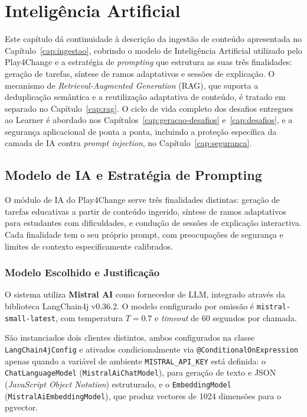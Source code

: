 %
%
\chapter{Inteligência Artificial} \label{cap:ia}

Este capítulo dá continuidade à descrição da ingestão de conteúdo apresentada no Capítulo~\ref{cap:ingestao}, cobrindo o modelo de Inteligência Artificial utilizado pelo Play4Change e a estratégia de \textit{prompting} que estrutura as suas três finalidades: geração de tarefas, síntese de ramos adaptativos e sessões de explicação. O mecanismo de \textit{Retrieval-Augmented Generation} (RAG), que suporta a deduplicação semântica e a reutilização adaptativa de conteúdo, é tratado em separado no Capítulo~\ref{cap:rag}. O ciclo de vida completo dos desafios entregues ao Learner é abordado nos Capítulos~\ref{cap:geracao-desafios} e~\ref{cap:desafios}, e a segurança aplicacional de ponta a ponta, incluindo a proteção específica da camada de IA contra \textit{prompt injection}, no Capítulo~\ref{cap:seguranca}.

\section{Modelo de IA e Estratégia de Prompting} \label{sec:ia-prompting}

O módulo de IA do Play4Change serve três finalidades distintas: geração de tarefas educativas a partir de conteúdo ingerido, síntese de ramos adaptativos para estudantes com dificuldades, e condução de sessões de explicação interactiva.
Cada finalidade tem o seu próprio prompt, com preocupações de segurança e limites de contexto especificamente calibrados.

\subsection{Modelo Escolhido e Justificação} \label{sec:modelo}

O sistema utiliza \textbf{Mistral AI} como fornecedor de LLM, integrado através da biblioteca LangChain4j v0.36.2.
O modelo configurado por omissão é \texttt{mistral-small-latest}, com temperatura $T=0.7$ e \textit{timeout} de 60 segundos por chamada.

São instanciados dois clientes distintos, ambos configurados na classe \texttt{LangChain4jConfig} e ativados condicionalmente via \texttt{@ConditionalOnExpression} apenas quando a variável de ambiente \texttt{MISTRAL\_API\_KEY} está definida: o \texttt{ChatLanguageModel} (\texttt{MistralAiChatModel}), para geração de texto e JSON (\textit{JavaScript Object Notation}) estruturado, e o \texttt{EmbeddingModel} (\texttt{MistralAiEmbeddingModel}), que produz vectores de 1024 dimensões para o pgvector.

